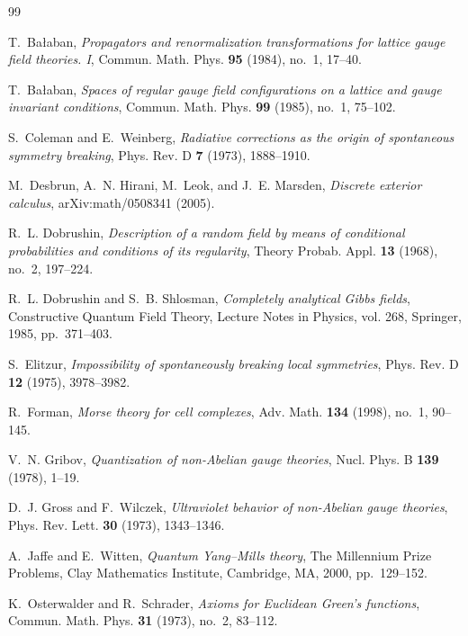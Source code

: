 \documentclass[11pt,reqno]{amsart}
\theoremstyle{plain}
\theoremstyle{definition}
\theoremstyle{remark}
\numberwithin{equation}{section}
\begin{document}
\begin{thebibliography}{99}

T.~Ba{\l}aban, \emph{Propagators and renormalization transformations for lattice gauge field theories. {I}}, Commun. Math. Phys. \textbf{95} (1984), no.~1, 17--40.

T.~Ba{\l}aban, \emph{Spaces of regular gauge field configurations on a lattice and gauge invariant conditions}, Commun. Math. Phys. \textbf{99} (1985), no.~1, 75--102.

S.~Coleman and E.~Weinberg, \emph{Radiative corrections as the origin of spontaneous symmetry breaking}, Phys. Rev. D \textbf{7} (1973), 1888--1910.

M.~Desbrun, A.~N. Hirani, M.~Leok, and J.~E. Marsden, \emph{Discrete exterior calculus}, arXiv:math/0508341 (2005).

R.~L. Dobrushin, \emph{Description of a random field by means of conditional probabilities and conditions of its regularity}, Theory Probab. Appl. \textbf{13} (1968), no.~2, 197--224.

R.~L. Dobrushin and S.~B. Shlosman, \emph{Completely analytical {G}ibbs fields}, Constructive Quantum Field Theory, Lecture Notes in Physics, vol. 268, Springer, 1985, pp.~371--403.

S.~Elitzur, \emph{Impossibility of spontaneously breaking local symmetries}, Phys. Rev. D \textbf{12} (1975), 3978--3982.

R.~Forman, \emph{Morse theory for cell complexes}, Adv. Math. \textbf{134} (1998), no.~1, 90--145.

V.~N. Gribov, \emph{Quantization of non-{A}belian gauge theories}, Nucl. Phys. B \textbf{139} (1978), 1--19.

D.~J. Gross and F.~Wilczek, \emph{Ultraviolet behavior of non-{A}belian gauge theories}, Phys. Rev. Lett. \textbf{30} (1973), 1343--1346.

A.~Jaffe and E.~Witten, \emph{Quantum {Y}ang--{M}ills theory}, The Millennium Prize Problems, Clay Mathematics Institute, Cambridge, MA, 2000, pp.~129--152.

K.~Osterwalder and R.~Schrader, \emph{Axioms for {E}uclidean {G}reen's functions}, Commun. Math. Phys. \textbf{31} (1973), no.~2, 83--112.


\end{thebibliography}
\end{document}
